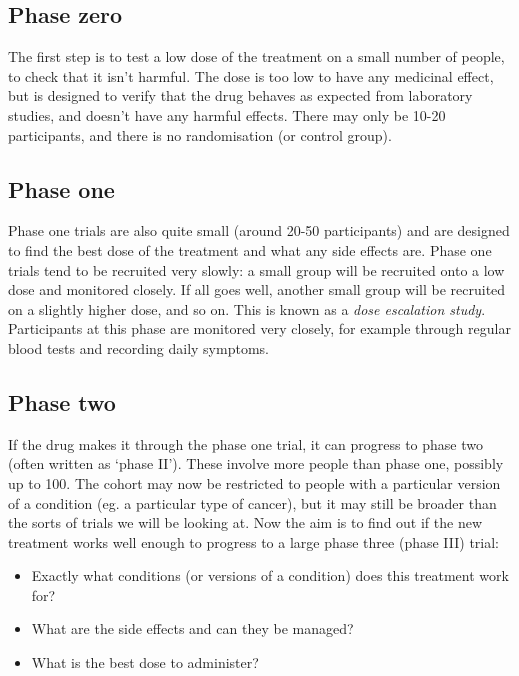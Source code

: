 \documentclass[
  openany]{book}
\providecommand{\tightlist}{%
  \setlength{\itemsep}{0pt}\setlength{\parskip}{0pt}}
\theoremstyle{definition}
\theoremstyle{definition}
\theoremstyle{definition}
\theoremstyle{definition}
\theoremstyle{remark}
\begin{document}
\subsection*{Phase zero}\label{phase-zero}

The first step is to test a low dose of the treatment on a small number of people, to check that it isn't harmful. The dose is too low to have any medicinal effect, but is designed to verify that the drug behaves as expected from laboratory studies, and doesn't have any harmful effects. There may only be 10-20 participants, and there is no randomisation (or control group).

\subsection*{Phase one}\label{phase-one}

Phase one trials are also quite small (around 20-50 participants) and are designed to find the best dose of the treatment and what any side effects are. Phase one trials tend to be recruited very slowly: a small group will be recruited onto a low dose and monitored closely. If all goes well, another small group will be recruited on a slightly higher dose, and so on. This is known as a \emph{dose escalation study}. Participants at this phase are monitored very closely, for example through regular blood tests and recording daily symptoms.

\subsection*{Phase two}\label{phase-two}

If the drug makes it through the phase one trial, it can progress to phase two (often written as `phase II'). These involve more people than phase one, possibly up to 100. The cohort may now be restricted to people with a particular version of a condition (eg. a particular type of cancer), but it may still be broader than the sorts of trials we will be looking at. Now the aim is to find out if the new treatment works well enough to progress to a large phase three (phase III) trial:

\begin{itemize}
\tightlist
\item
  Exactly what conditions (or versions of a condition) does this treatment work for?
\item
  What are the side effects and can they be managed?
\item
  What is the best dose to administer?
\end{itemize}
\end{document}
